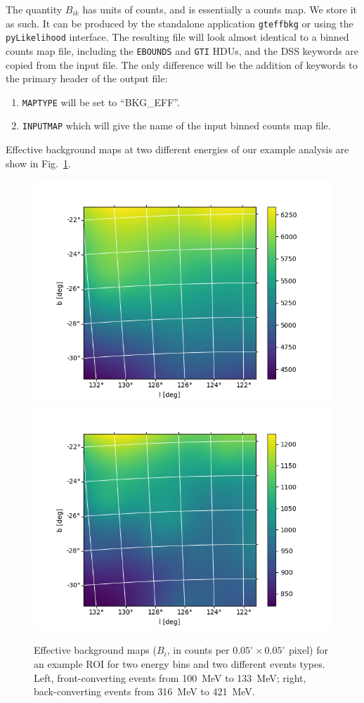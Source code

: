 \documentclass[preprint]{aastex}
\begin{document}
The quantity $B_{ik}$ has units of counts, and is essentially a counts
map.  We store it as such.  It can be produced by the standalone
application {\tt gteffbkg} or using the {\tt pyLikelihood} interface.
The resulting file will look almost identical to a binned counts map
file, including the {\tt EBOUNDS} and {\tt GTI} HDUs, and the DSS
keywords are copied from the input file.  The only difference will be
the addition of keywords to the primary header of the output file:

\begin{enumerate}
\item{{\tt MAPTYPE} will be set to ``BKG\_EFF''.}
\item{{\tt INPUTMAP} which will give the name of the input binned counts map
file.}
\end{enumerate}

Effective background maps at two different energies of our example analysis are show in 
Fig.~\ref{fig:beff}. 

\begin{figure}[h]  
\begin{centering}
\includegraphics[width=0.49\columnwidth]{figures/beff_E00_00.png}
\includegraphics[width=0.49\columnwidth]{figures/beff_E01_04.png}
\vspace{-0.10in}
\caption{\label{fig:beff}Effective background maps ($B_{i}$, in counts per 
  $0.05^\circ\times0.05^\circ$ pixel) for an example ROI
  for two energy bins and two different events types.  Left, front-converting events 
  from 100~MeV to 133~MeV; right, back-converting events from 316~MeV to 421~MeV.}
\end{centering}
\end{figure}
\end{document}
